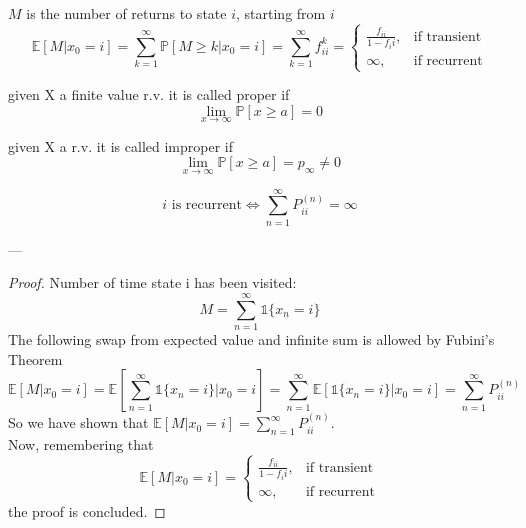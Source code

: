 	\begin{definition}
		$M$ is the number of returns to state $i$, starting from $i$
		$$\mathbb{E}[M | x_0 = i] = \sum_{k=1}^\infty \mathbb{P}[M\geq k | x_0 = i] = \sum_{k=1}^\infty f_{ii}^k = \begin{cases}
		\frac{f_{ii}}{1-f_ii}, & \mbox{if transient} \\
		\infty, & \mbox{if recurrent}
		\end{cases}$$
	\end{definition}

	\begin{definition}[Proper r.v]
		given X a finite value r.v. it is called proper if $$\lim_{x\to \infty} \mathbb{P}[x\geq a] = 0$$
	\end{definition}

	\begin{definition}[Improper r.v]
		given X a r.v. it is called improper if  $$\lim_{x\to \infty} \mathbb{P}[x\geq a] = p_\infty \ne 0$$
	\end{definition}

	\begin{theorem}
		$$i  \mbox{ is recurrent} \iff \sum_{n=1}^\infty P_{ii}^{(n)} = \infty$$
	\end{theorem}
	---

	\begin{proof}
		Number of time state i has been visited: $$M = \sum_{n=1}^\infty \mathds{1}\{x_n =i\} $$
		The following swap from expected value and infinite sum is allowed by Fubini's Theorem$$ \mathbb{E}[M | x_0 = i] = \mathbb{E}[\sum_{n=1}^\infty \mathds{1}\{x_n = i\} | x_0 = i] = \sum_{n=1}^\infty \mathbb{E}[\mathds{1}\{ x_n = i\} | x_0 = i] = \sum_{n=1}^\infty P_{ii}^{(n)} $$
		So we have shown that $\mathbb{E}[M | x_0=i] = \sum_{n=1}^\infty P_{ii}^{(n)}$.\\
		Now, remembering that$$ \mathbb{E}[M | x_0 = i] = \begin{cases}
		\frac{f_{ii}}{1-f_ii}, & \mbox{if transient} \\
		\infty, & \mbox{if recurrent}
		\end{cases}$$
		the proof is concluded.
	\end{proof}

